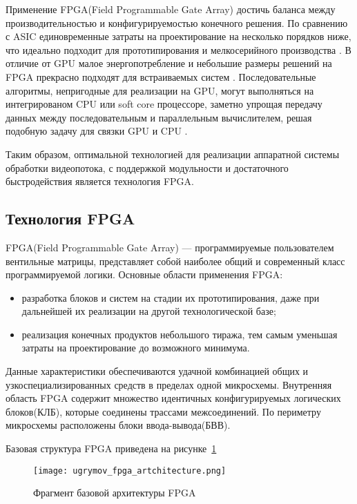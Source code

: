 Применение FPGA(Field Programmable Gate Array) достичь баланса между производительностью и конфигурируемостью конечного решения.
По сравнению с ASIC единовременные затраты на проектирование на несколько порядков ниже,
что идеально подходит для прототипирования и мелкосерийного производства \cite{zuchowski_asic_vs_fpga_cost}.
В отличие от GPU малое энергопотребление и небольшие размеры решений на FPGA прекрасно подходят
для встраиваемых систем \cite{berten_gpu_fpga_comparison}.
Последовательные алгоритмы, непригодные для реализации на GPU, могут выполняться
на интегрированом CPU или soft core процессоре, заметно упрощая передачу данных
между последовательным и параллельным вычислителем, решая подобную задачу
для связки GPU и CPU \cite{russo_softcore_fpga_vs_gpu}.

Таким образом, оптимальной технологией для реализации аппаратной системы обработки видеопотока,
с поддержкой модульности и достаточного быстродействия является технология FPGA.


\subsection{Технология FPGA}
\label{sub:domain:fpga}

FPGA(Field Programmable Gate Array) --- программируемые пользователем вентильные матрицы,
представляет собой наиболее общий и современный класс программируемой логики.
Основные области применения FPGA:
\begin{itemize}
  \item разработка блоков и систем на стадии их прототипирования, даже при дальнейшей их реализации на другой технологической базе;
  \item реализация конечных продуктов небольшого тиража, тем самым уменьшая затраты на проектирование до возможного минимума.
\end{itemize}

Данные характеристики обеспечиваются удачной комбинацией общих и узкоспециализированных средств
в пределах одной микросхемы. Внутренняя область FPGA содержит множество идентичных конфигурируемых логических блоков(КЛБ),
которые соединены трассами межсоединений. По периметру микросхемы расположены блоки ввода-вывода(БВВ).

Базовая структура FPGA приведена на рисунке~\ref{fig:domain:fpga:fpga_architecture}

\begin{figure}[ht]
  \centering
  \texttt{[image: ugrymov\_fpga\_artchitecture.png]}
  \caption{ Фрагмент базовой архитектуры FPGA \cite{ugrymov_digital_circuit_engineering} }
  \label{fig:domain:fpga:fpga_architecture}
\end{figure}

